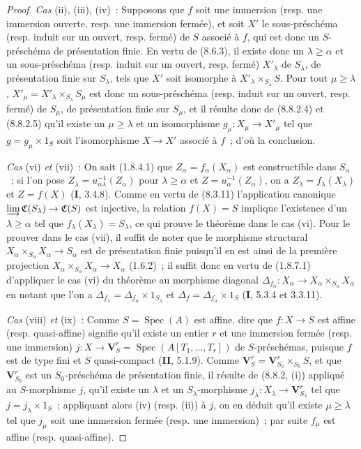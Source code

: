 \begin{proof}
\emph{Cas} (ii), (iii), (iv)~: Supposons que $f$ soit une immersion (resp.
une immersion ouverte, resp. une immersion fermée), et soit $X'$ le
sous-préschéma (resp. induit sur un ouvert, resp. fermé) de $S$ associé à $f$,
qui est donc un $S$-préschéma de présentation finie.
En vertu de (8.6.3), il existe donc un $\lambda\geq\alpha$ et un
sous-préschéma (resp. induit sur un ouvert, resp. fermé) $X'_\lambda$ de
$S_\lambda$, de présentation finie sur $S_\lambda$, tels que $X'$ soit
isomorphe à $X'_\lambda\times_{S_\lambda}S$. Pour tout $\mu\geq\lambda$,
$X'_\mu=X'_\lambda\times_{S_\lambda}S_\mu$ est donc un sous-préschéma (resp.
induit sur un ouvert, resp. fermé) de $S_\mu$, de présentation finie sur
$S_\mu$, et il résulte donc de (8.8.2.4) et (8.8.2.5) qu'il existe un
$\mu\geq\lambda$ et un isomorphisme $g_\mu:X_\mu\to X'_\mu$ tel que
$g=g_\mu\times1_S$ soit l'isomorphisme $X\to X'$ associé à $f$~; d'où la
conclusion.

\emph{Cas} (vi) \emph{et} (vii)~: On sait (1.8.4.1) que
$Z_\alpha=f_\alpha(X_\alpha)$ est constructible dans $S_\alpha$~; si l'on
pose $Z_\lambda=u_{\alpha\lambda}^{-1}(Z_\alpha)$ pour $\lambda\geq\alpha$
et $Z=u_\alpha^{-1}(Z_\alpha)$, on a $Z_\lambda=f_\lambda(X_\lambda)$ et
$Z=f(X)$ (\textbf{I}, 3.4.8). Comme en vertu de (8.3.11) l'application canonique
$\varinjlim\mathfrak C(S_\lambda)\to\mathfrak C(S)$ est injective, la
relation $f(X)=S$ implique l'existence d'un $\lambda\geq\alpha$ tel que
$f_\lambda(X_\lambda)=S_\lambda$, ce qui prouve le théorème dans le cas (vi).
Pour le prouver dans le cas (vii), il suffit de noter que le morphisme
structural $X_\alpha\times_{S_\alpha}X_\alpha\to S_\alpha$ est de présentation
finie puisqu'il en est ainsi de la première projection
$X_\alpha\times_{S_\alpha}X_\alpha\to X_\alpha$ (1.6.2)~; il suffit donc en
vertu de (1.8.7.1) d'appliquer le cas (vi) du théorème au morphisme diagonal
$\Delta_{f_\alpha}:X_\alpha\to X_\alpha\times_{S_\alpha}X_\alpha$ en notant
que l'on a $\Delta_{f_\lambda}=\Delta_{f_\alpha}\times1_{S_\lambda}$ et
$\Delta_f=\Delta_{f_\alpha}\times1_S$ (\textbf{I}, 5.3.4 et 3.3.11).

\emph{Cas} (viii) \emph{et} (ix)~: Comme $S=\operatorname{Spec}(A)$ est affine, dire
que $f:X\to S$ est affine (resp. quasi-affine) signifie qu'il existe un entier
$r$ et une immersion fermée (resp. une immersion)
$j:X\to\mathbf V_S^r=\operatorname{Spec}(A[T_1,\ldots,T_r])$ de
$S$-préschémas, puisque $f$ est de type fini et $S$ quasi-compact
(\textbf{II}, 5.1.9). Comme
$\mathbf V_S^r=\mathbf V_{S_0}^r\times_{S_0}S$, et que
$\mathbf V_{S_0}^r$ est un $S_0$-préschéma de présentation finie, il résulte
de (8.8.2, (i)) appliqué au $S$-morphisme $j$, qu'il existe un $\lambda$ et un
$S_\lambda$-morphisme $j_\lambda:X_\lambda\to\mathbf V_{S_\lambda}^r$ tel que
$j=j_\lambda\times1_S$~; appliquant alors (iv) (resp. (ii)) à $j$, on en
déduit qu'il existe $\mu\geq\lambda$ tel que $j_\mu$ soit une immersion
fermée (resp. une immersion)~; par suite $f_\mu$ est affine (resp.
quasi-affine).


\end{proof}
